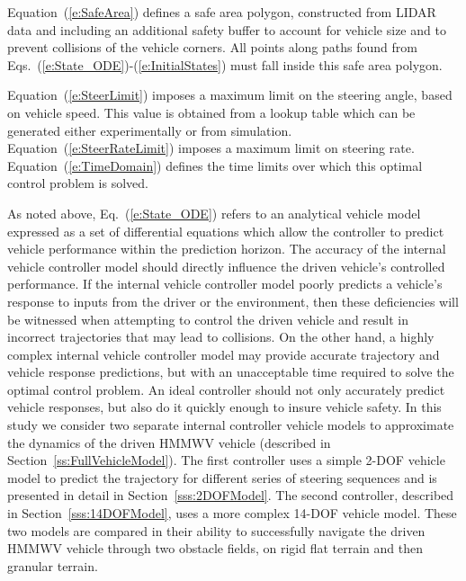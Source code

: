 \documentclass[12pt,twocolumn]{article}
\newcommand{\CHRONO}{{\sffamily{{Chrono}}}}
\begin{document}
Equation~(\ref{e:SafeArea}) defines a safe area polygon, constructed from LIDAR data and including an additional safety buffer to account for vehicle size and to prevent collisions of the vehicle corners.  All points along paths found from Eqs.~(\ref{e:State_ODE})-(\ref{e:InitialStates}) must fall inside this safe area polygon.

Equation~(\ref{e:SteerLimit}) imposes a maximum limit on the steering angle, based on vehicle speed. This value is obtained from a lookup table which can be generated either experimentally or from simulation. Equation~(\ref{e:SteerRateLimit}) imposes a maximum limit on steering rate. Equation~(\ref{e:TimeDomain}) defines the time limits over which this optimal control problem is solved.

As noted above, Eq.~(\ref{e:State_ODE}) refers to an analytical vehicle model expressed as a set of differential equations which allow the controller to predict vehicle performance within the prediction horizon. The accuracy of the internal vehicle controller model should directly influence the driven vehicle's controlled performance. If the internal vehicle controller model poorly predicts a vehicle's response to inputs from the driver or the environment, then these deficiencies will be witnessed when attempting to control the driven vehicle and result in incorrect trajectories that may lead to collisions. On the other hand, a highly complex internal vehicle controller model may provide accurate trajectory and vehicle response predictions, but with an unacceptable time required to solve the optimal control problem. An ideal controller should not only accurately predict vehicle responses, but also do it quickly enough to insure vehicle safety. 
In this study we consider two separate internal controller vehicle models to approximate the dynamics of the driven {\CHRONO} HMMWV vehicle (described in Section~\ref{ss:FullVehicleModel}).  The first controller uses a simple 2-DOF vehicle model to predict the trajectory for different series of steering sequences and is presented in detail in Section~\ref{sss:2DOFModel}. The second controller, described in Section~\ref{sss:14DOFModel}, uses a more complex 14-DOF vehicle model. These two models are compared in their ability to successfully navigate the driven HMMWV vehicle through two obstacle fields, on rigid flat terrain and then granular terrain.
\end{document}

